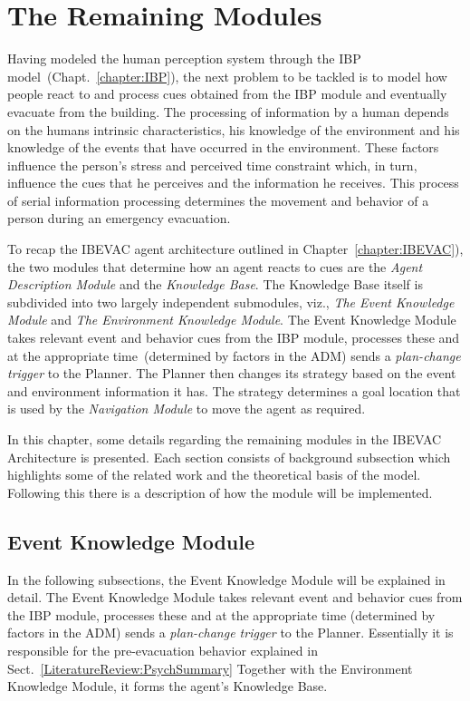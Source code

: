 \chapter{The Remaining Modules}
\label{chapter:TheRemainingModules}

Having modeled the human perception system through the IBP model~(Chapt.~\ref{chapter:IBP}), the next problem to be tackled is to model how people react to and process cues obtained from the IBP module and eventually evacuate from the building. The processing of information by a human depends on the humans intrinsic characteristics, his knowledge of the environment and his knowledge of the events that have occurred in the environment. These factors influence the person's stress and perceived time constraint which, in turn, influence the cues that he perceives and the information he receives. This process of serial information processing determines the movement and behavior of a person during an emergency evacuation.

To recap the IBEVAC agent architecture outlined in Chapter~\ref{chapter:IBEVAC}), the two modules that determine how an agent reacts to cues are the \emph{Agent Description Module} and the \emph{Knowledge Base}. The Knowledge Base itself is subdivided into two largely independent submodules, viz., \emph{The Event Knowledge Module} and \emph{The Environment Knowledge Module}. The Event Knowledge Module takes relevant event and behavior cues from the IBP module, processes these and at the appropriate time~(determined by factors in the ADM) sends a \emph{plan-change trigger} to the Planner. The Planner then changes its strategy based on the event and environment information it has. The strategy determines a goal location that is used by the \emph{Navigation Module} to move the agent as required.

In this chapter, some details regarding the remaining modules in the IBEVAC Architecture is presented. Each section consists of background subsection which highlights some of the related work and the theoretical basis of the model. Following this there is a description of how the module will be implemented.

\section{Event Knowledge Module}
\label{CFW:EventIdentification}

In the following subsections, the Event Knowledge Module will be explained in detail. The Event Knowledge Module takes relevant event and behavior cues from the IBP module, processes these and at the appropriate time (determined by factors in the ADM) sends a \emph{plan-change trigger} to the Planner. Essentially it is responsible for the pre-evacuation behavior explained in Sect.~\ref{LiteratureReview:PsychSummary} Together with the Environment Knowledge Module, it forms the agent's Knowledge Base. 



